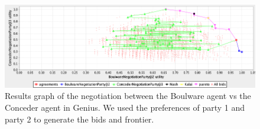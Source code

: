 \documentclass[a4paper]{article}
\begin{document}
\begin{figure}[h!]
\centering
\includegraphics[width=125mm]{boulvsconcede.png}
\caption{Results graph of the negotiation between the Boulware agent vs the Conceder agent in Genius. We used the preferences of party 1 and party 2 to generate the bids and frontier.}
\label{fig:Boulware vs Conceder agent}
\end{figure}
\end{document}
